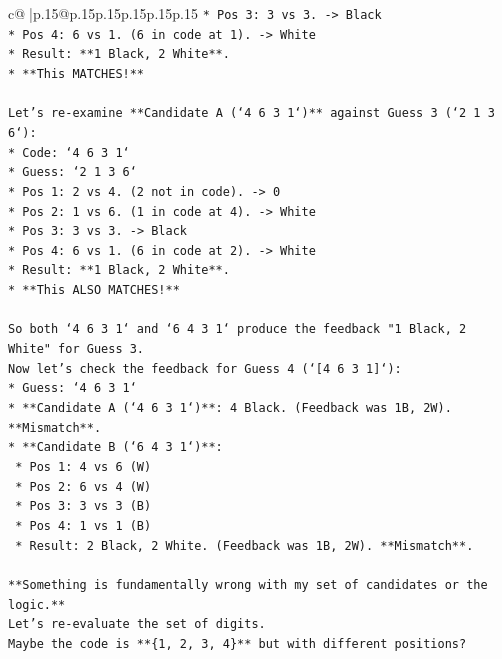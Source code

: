 \documentclass{article}
\begin{document}
{\begin{supertabular}{c@{$\;$}|p{.15\linewidth}@{}p{.15\linewidth}p{.15\linewidth}p{.15\linewidth}p{.15\linewidth}p{.15\linewidth}}
{{{\texttt{*   Pos 3: 3 vs 3. {-}> Black} \\
\texttt{*   Pos 4: 6 vs 1. (6 in code at 1). {-}> White} \\
\texttt{*   Result: **1 Black, 2 White**.} \\
\texttt{*   **This MATCHES!**} \\
\\ 
\texttt{Let's re{-}examine **Candidate A (`4 6 3 1`)** against Guess 3 (`2 1 3 6`):} \\
\texttt{*   Code: `4 6 3 1`} \\
\texttt{*   Guess: `2 1 3 6`} \\
\texttt{*   Pos 1: 2 vs 4. (2 not in code). {-}> 0} \\
\texttt{*   Pos 2: 1 vs 6. (1 in code at 4). {-}> White} \\
\texttt{*   Pos 3: 3 vs 3. {-}> Black} \\
\texttt{*   Pos 4: 6 vs 1. (6 in code at 2). {-}> White} \\
\texttt{*   Result: **1 Black, 2 White**.} \\
\texttt{*   **This ALSO MATCHES!**} \\
\\ 
\texttt{So both `4 6 3 1` and `6 4 3 1` produce the feedback "1 Black, 2 White" for Guess 3.} \\
\texttt{Now let's check the feedback for Guess 4 (`{[}4 6 3 1{]}`):} \\
\texttt{*   Guess: `4 6 3 1`} \\
\texttt{*   **Candidate A (`4 6 3 1`)**: 4 Black. (Feedback was 1B, 2W). **Mismatch**.} \\
\texttt{*   **Candidate B (`6 4 3 1`)**:} \\
\texttt{    *   Pos 1: 4 vs 6 (W)} \\
\texttt{    *   Pos 2: 6 vs 4 (W)} \\
\texttt{    *   Pos 3: 3 vs 3 (B)} \\
\texttt{    *   Pos 4: 1 vs 1 (B)} \\
\texttt{    *   Result: 2 Black, 2 White. (Feedback was 1B, 2W). **Mismatch**.} \\
\\ 
\texttt{**Something is fundamentally wrong with my set of candidates or the logic.**} \\
\texttt{Let's re{-}evaluate the set of digits.} \\
\texttt{Maybe the code is **\{1, 2, 3, 4\}** but with different positions?} \\
}}}
\end{supertabular}}
\end{document}
